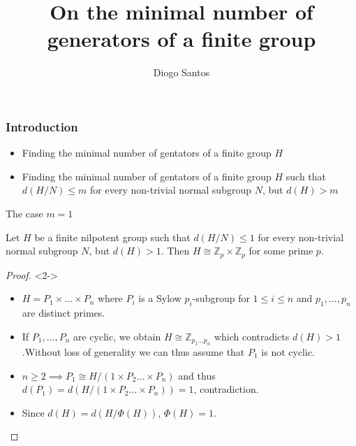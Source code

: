 \documentclass{beamer}
\title{On the minimal number of generators of a finite group}
\author{Diogo Santos}
\begin{document}
\maketitle

\begin{frame}
    \frametitle{Introduction}
    \begin{itemize}
        \item<1-> Finding the minimal number of gentators of a finite group $H$ \\
    \end{itemize}
    \begin{itemize}
        \item<2-> Finding the minimal number of gentators of a finite group $H$ such that $d(H/N) \le m$ for every non-trivial normal subgroup $N$, but $d(H) > m$\\
    \end{itemize}

\end{frame}

\begin{frame}{The case $m = 1$}
    \begin{theorem}
        Let $H$ be a finite nilpotent group such that $d(H/N) \le 1$ for every non-trivial normal subgroup $N$, but $d(H) > 1$. Then $H \cong \mathbb{Z}_p \times \mathbb{Z}_p$ for some prime $p$.
    \end{theorem}

    \begin{proof}<2->
        \renewcommand{\qedsymbol}{} %
        \begin{itemize}
            \item $H = P_1 \times \ldots  \times P_n$ where $P_i$ is a Sylow $p_i$-subgroup for $1 \le i \le n$ and $p_1,\ldots ,p_n$ are distinct primes.
            \item<3-> If $P_1,\ldots , P_n$ are cyclic, we obtain $H \cong \mathbb{Z}_{p_1\ldots p_n}$  which contradicts $d(H) > 1$.Without loss of generality we can thus assume that $P_1$ is not cyclic.
            \item<4-> $n \ge 2 \implies P_1 \cong H/(1 \times P_2 \ldots  \times P_n)$ and thus $d(P_1) = d(H/(1 \times P_2 \ldots  \times P_n)) = 1$, contradiction.
            \item<5-> Since $d(H) = d(H/\Phi(H))$, $\Phi(H) = 1$.
        \end{itemize}
    \end{proof}
\end{frame}
\end{document}
